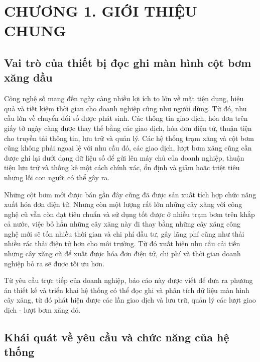     \section*{CHƯƠNG 1. GIỚI THIỆU CHUNG} 

\setcounter{section}{1} 
    \setcounter{subsection}{0}
        \setcounter{figure}{0}
            \setcounter{table}{0}

\subsection{Vai trò của thiết bị đọc ghi màn hình cột bơm xăng dầu}

\hspace{1cm} Công nghệ số mang đến ngày càng nhiều lợi ích to lớn về mặt tiện dụng, hiệu quả và tiết kiệm thời gian cho doanh nghiệp cũng như người dùng. Từ đó, nhu cầu lớn về chuyển đổi số được phát sinh. Các thông tin giao dịch, hóa đơn trên giấy tờ ngày càng được thay thế bằng các giao dịch, hóa đơn điện tử, thuận tiện cho truyền tải thông tin, lưu trữ và quản lý. Các hệ thống trạm xăng và cột bơm cũng không phải ngoại lệ với nhu cầu đó, các giao dịch, lượt bơm xăng cũng cần được ghi lại dưới dạng dữ liệu số để gửi lên máy chủ của doanh nghiệp, thuận tiện lưu trữ và thống kê một cách chính xác, ổn định và giảm hoặc triệt tiêu những lỗi con người có thể gây ra.

Những cột bơm mới được bán gần đây cũng đã được sản xuất tích hợp chức năng xuất hóa đơn điện tử. Nhưng còn một lượng rất lớn những cây xăng với công nghệ cũ vẫn còn đạt tiêu chuẩn và sử dụng tốt được ở nhiều trạm bơm trên khắp cả nước, việc bỏ hẳn những cây xăng này đi thay bằng những cây xăng công nghệ mới sẽ tốn nhiều thời gian và chi phí đầu tư, gây lãng phí cũng như thải nhiều rác thải điện tử hơn cho môi trường. Từ đó xuất hiện nhu cầu cải tiến những cây xăng cũ để xuất được hóa đơn điện tử, chi phí và thời gian doanh nghiệp bỏ ra sẽ được tối ưu hơn.

Từ yêu cầu trực tiếp của doanh nghiệp, báo cáo này được viết để đưa ra phương án thiết kế và triển khai hệ thống có thể đọc ghi và phân tích dữ liệu màn hình cây xăng, từ đó phát hiện được các lần giao dịch và lưu trữ, quản lý các lượt giao dịch - lượt bơm xăng đó.


\subsection{Khái quát về yêu cầu và chức năng của hệ thống}

